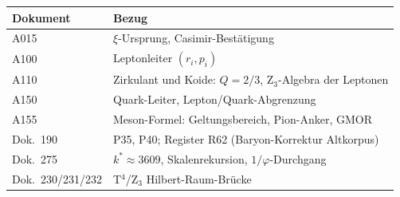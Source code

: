 \begin{center}
{\small\begin{tabular}{ll}
\toprule
Dokument & Bezug \\
\midrule
A015 & $\xi$-Ursprung, Casimir-Bestätigung \\
A100 & Leptonleiter $(r_i, p_i)$ \\
A110 & Zirkulant und Koide: $Q=2/3$, Z$_3$-Algebra der Leptonen \\
A150 & Quark-Leiter, Lepton/Quark-Abgrenzung \\
A155 & Meson-Formel: Geltungsbereich, Pion-Anker, GMOR \\
Dok.~190 & P35, P40; Register R62 (Baryon-Korrektur Altkorpus) \\
Dok.~275 & $k^*\approx3609$, Skalenrekursion, $1/\varphi$-Durchgang \\
Dok.~230/231/232 & T$^4$/Z$_3$ Hilbert-Raum-Brücke \\
\bottomrule
\end{tabular}}
\end{center}
